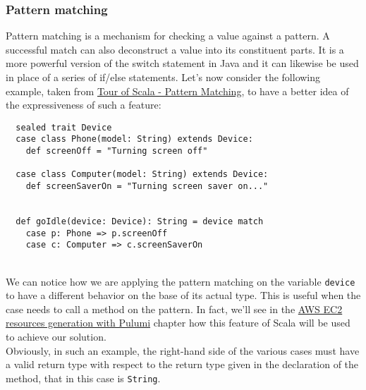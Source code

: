 \subsubsection{Pattern matching}
Pattern matching is a mechanism for checking a value against a pattern.
A successful match can also deconstruct a value into its constituent parts.
It is a more powerful version of the switch statement in Java and it can likewise be used in place of a series of if/else statements.
Let's now consider the following example, taken from \href{https://docs.scala-lang.org/tour/pattern-matching.html#}{Tour of Scala - Pattern Matching}, to have a better idea of the expressiveness of such a feature:
\begin{verbatim}
  sealed trait Device
  case class Phone(model: String) extends Device:
    def screenOff = "Turning screen off"

  case class Computer(model: String) extends Device:
    def screenSaverOn = "Turning screen saver on..."


  def goIdle(device: Device): String = device match
    case p: Phone => p.screenOff
    case c: Computer => c.screenSaverOn
\end{verbatim}\mbox{}\\
We can notice how we are applying the pattern matching on the variable \texttt{device} to have a different behavior on the base of its actual type.
This is useful when the case needs to call a method on the pattern.
In fact, we'll see in the \hyperref[cap:case-study]{AWS EC2 resources generation with Pulumi} chapter how this feature of Scala will be used to achieve our solution.\\
Obviously, in such an example, the right-hand side of the various cases must have a valid return type with respect to the return type given in the declaration of the method, that in this case is \texttt{String}.

